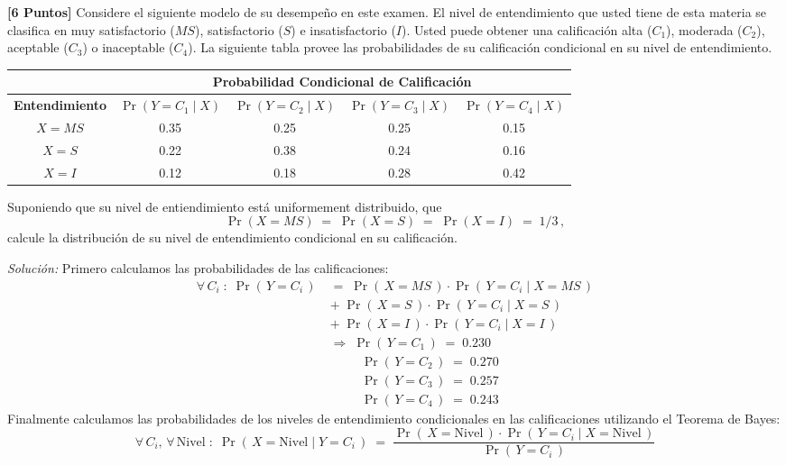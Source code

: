 \documentclass[ a4paper, twoside, 11pt]{article}
\begin{document}
\begin{problem}
\textbf{[6 Puntos]} Considere el siguiente modelo de su desempe\~no en este examen. El nivel de entendimiento que usted tiene de esta materia se clasifica en muy satisfactorio ($MS$), satisfactorio ($S$) e insatisfactorio ($I$). Usted puede obtener una calificaci\'on alta ($C_1$), moderada ($C_2$), aceptable ($C_3$) o inaceptable ($C_4$). La siguiente tabla provee las probabilidades de su calificaci\'on condicional en su nivel de entendimiento. 

\begin{table}[htb]
\centering
\begin{tabular}{c|c|c|c|c|}
\cline{2-5}
 & \multicolumn{4}{c|}{\textbf{Probabilidad Condicional de Calificaci\'on}} \\ \hline
\multicolumn{1}{|c|}{\textbf{Entendimiento}} & $\Pr( Y=C_1 \mid X)$ & $\Pr( Y=C_2 \mid X)$ & $\Pr( Y=C_3 \mid X)$ & $\Pr( Y=C_4 \mid X)$ \\ \hline
\multicolumn{1}{|c|}{$X=MS$} & 0.35 & 0.25 & 0.25 & 0.15 \\ \hline
\multicolumn{1}{|c|}{$X=S$} & 0.22 & 0.38 & 0.24 & 0.16 \\ \hline
\multicolumn{1}{|c|}{$X=I$} & 0.12 & 0.18 & 0.28 & 0.42 \\ \hline
\end{tabular}
\end{table}

Suponiendo que su nivel de entiendimiento est\'a uniformement distribuido, \ie que
\[
\Pr(X=MS) \; = \; \Pr(X=S) \; = \; \Pr(X=I) \; = \; 1/3 \, ,
\]
calcule la distribuci\'on de su nivel de entendimiento condicional en su calificaci\'on. 

\emph{Soluci\'on:} Primero calculamos las probabilidades de las calificaciones: 
\begin{align*}
\forall \, C_i \; \colon \; \Pr( \, Y = C_i \, ) \;
& = \; \Pr( \, X=MS \, )
\cdot \Pr( \, Y= C_i \mid X=MS \, ) \\
& + \; \Pr( \, X=S \, )
\cdot \Pr( \, Y= C_i \mid X=S \, ) \\
& + \; \Pr( \, X=I \, )
\cdot \Pr( \, Y= C_i \mid X=I \, ) \\[2ex]
& \Longrightarrow \; \Pr( \, Y = C_1 \, ) \; = \; 0.230 \\
& \quad \quad \, \; \Pr( \, Y = C_2 \, ) \; = \; 0.270 \\
& \quad \quad \, \; \Pr( \, Y = C_3 \, ) \; = \; 0.257 \\
& \quad \quad \, \; \Pr( \, Y = C_4 \, ) \; = \; 0.243
\end{align*}
Finalmente calculamos las probabilidades de los niveles de entendimiento condicionales en las calificaciones utilizando el Teorema de Bayes: 
\[
\forall \, C_i, \, \forall \, \text{Nivel} \; \colon \;
\Pr( \, X = \text{Nivel} \mid Y = C_i \, ) \; = \;
\frac{ \Pr( \, X = \text{Nivel} \, ) \cdot \Pr( \, Y = C_i \mid X = \text{Nivel} \, )}{ \Pr( \, Y = C_i \, ) }
\]


\end{problem}
\end{document}
